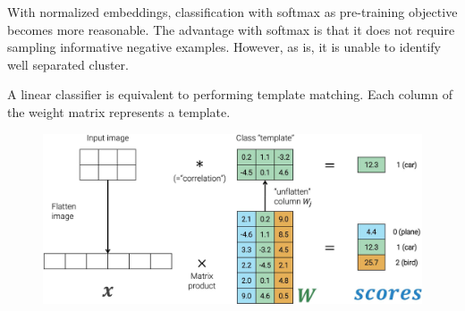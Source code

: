 \begin{remark}
    With normalized embeddings, classification with softmax as pre-training objective becomes more reasonable. The advantage with softmax is that it does not require sampling informative negative examples. However, as is, it is unable to identify well separated cluster.
\end{remark}

\begin{remark}
    A linear classifier is equivalent to performing template matching. Each column of the weight matrix represents a template.

    \begin{figure}[H]
        \centering
        \includegraphics[width=0.6\linewidth]{./img/_template_matching.jpg}
    \end{figure}
\end{remark}

